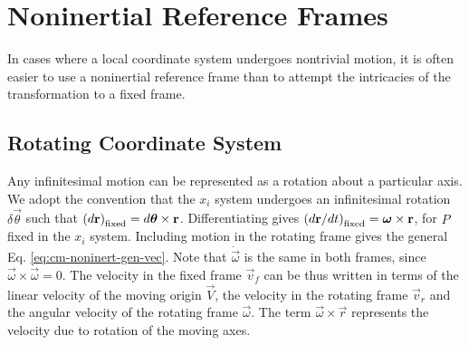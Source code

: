 


\newpage
\section{Noninertial Reference Frames}
\label{sec:cm-noninertial}

In cases where a local coordinate system undergoes nontrivial motion, it is often easier to use a noninertial reference frame than to attempt the intricacies of the transformation to a fixed frame.
\subsection{Rotating Coordinate System}
Any infinitesimal motion can be represented as a rotation about a particular axis. We adopt the convention that the $x_i$ system undergoes an infinitesimal rotation $\delta\vec{\theta}$ such that $\left(d\boldsymbol{\mathbf{r}}\right)_{\text{fixed}} = d\boldsymbol{\mathbf{\theta}}\times\boldsymbol{\mathbf{r}}$. Differentiating gives $\left(d\boldsymbol{\mathbf{r}}/dt\right)_{\text{fixed}} = \boldsymbol{\mathbf{\omega}}\times\boldsymbol{\mathbf{r}}$, for $P$ fixed in the $x_i$ system. Including motion in the rotating frame gives the general Eq. \ref{eq:cm-noninert-gen-vec}. Note that $\dot{\vec{\omega}}$ is the same in both frames, since $\vec{\omega}\times \vec{\omega} = 0$.
The velocity in the fixed frame $\vec{v}_f$ can be thus written in terms of the linear velocity of the moving origin $\vec{V}$, the velocity in the rotating frame $\vec{v}_r$ and the angular velocity of the rotating frame $\vec{\omega}$. The term $\vec{\omega}\times\vec{r}$ represents the velocity due to rotation of the moving axes.
